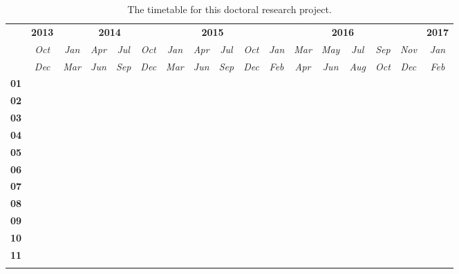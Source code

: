 \begin{table}[htb]
  \renewcommand{\arraystretch}{1.4}
  \caption{The timetable for this doctoral research project.}
  \label{tab:timetable}
  \tiny
  \centering
  \begin{tabular}{c|c|cccc|cccc|cccccc|c}
    \toprule
    & {\bf 2013}
    & \multicolumn{4}{c|}{{\bf 2014}}
    & \multicolumn{4}{c|}{{\bf 2015}}
    & \multicolumn{6}{c|}{{\bf 2016}}
    & {\bf 2017} \\

    & {\it Oct} & {\it Jan} & {\it Apr} & {\it Jul} & {\it Oct} & {\it Jan} &
    {\it Apr} & {\it Jul} & {\it Oct} & {\it Jan} & {\it Mar} & {\it May} &
    {\it Jul} & {\it Sep} & {\it Nov} & {\it Jan} \\

    & {\it Dec} & {\it Mar} & {\it Jun} & {\it Sep} & {\it Dec} & {\it Mar} &
    {\it Jun} & {\it Sep} & {\it Dec} & {\it Feb} & {\it Apr} & {\it Jun} &
    {\it Aug} & {\it Oct} & {\it Dec} & {\it Feb} \\
    \hline %
    \arrayrulecolor{lightgray}

    {\bf 01} & \m & \m &    &    &    &    &    &    &    &    &    &    &    &    &    &    \\ \hline
    {\bf 02} &    & \m &    &    &    &    &    &    &    &    &    &    &    &    &    &    \\ \hline
    {\bf 03} &    & \m & \m & \m & \m &    &    &    &    &    &    &    &    &    &    &    \\ \hline
    {\bf 04} &    &    &    & \m & \m & \m &    &    &    &    &    &    &    &    &    &    \\ \hline
    {\bf 05} &    &    &    &    &    & \m & \m & \m &    &    &    &    &    &    &    &    \\ \hline
    {\bf 06} &    &    &    &    &    &    &    & \m & \m &    &    &    &    &    &    &    \\ \hline
    {\bf 07} &    &    &    &    &    &    &    &    & \x & \x &    &    &    &    &    &    \\ \hline
    {\bf 08} &    &    &    &    &    &    &    &    & \x & \x & \x &    &    &    &    &    \\ \hline
    {\bf 09} &    &    &    &    &    &    &    &    &    & \x & \x & \x & \x & \x &    &    \\ \hline
    {\bf 10} &    &    &    &    &    &    &    &    &    &    &    & \x & \x & \x & \x &    \\ \hline
    {\bf 11} &    &    &    &    &    &    &    &    &    &    &    &    &    & \x & \x & \x \\

    \arrayrulecolor{black}
    \bottomrule
  \end{tabular}
\end{table}



